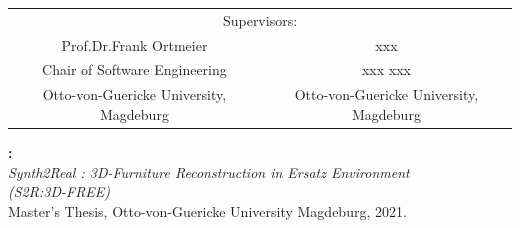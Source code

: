 \documentclass[
]{thesis}
\newcommand{\university}{Otto-von-Guericke University Magdeburg}
\newcommand{\advisorone}{Marco Filax}
\newcommand{\departmentone}{Chair of Software Engineering}
\newcommand{\universityone}{Otto-von-Guericke University, Magdeburg}
\newcommand{\advisortwo}{Konstantin Kirchheim}
\newcommand{\departmenttwo}{Chair of Software Engineering}
\newcommand{\universitytwo}{Otto-von-Guericke University, Magdeburg}
\newcommand{\supervisorone}{Prof.Dr.Frank Ortmeier}
\newcommand{\sdepartmentone}{Chair of Software Engineering}
\newcommand{\suniversityone}{Otto-von-Guericke University, Magdeburg}
\newcommand{\supervisortwo}{xxx}
\newcommand{\sdepartmenttwo}{xxx xxx}
\newcommand{\suniversitytwo}{Otto-von-Guericke University, Magdeburg}
\newcommand{\advisorthree}{}
\newcommand{\departmentthree}{}
\newcommand{\universitythree}{}
\newcommand{\thesiskind}{Master's Thesis}
\newcommand{\thetitle}{Synth2Real : 3D-Furniture Reconstruction in Ersatz Environment \\ (S2R:3D-FREE)}
\newcommand{\theyear}{2021}
\begin{document}
\begin{titlepage}
\begin{center}
    \begin{tabular}{cc}
        \multicolumn{2}{c}{\small Supervisors:} \\[1mm]
        {\large \supervisorone} & {\large \supervisortwo} \\[2mm]
        {\small \sdepartmentone} 			 & {\small \sdepartmenttwo} \\
        {\small \suniversityone} 			 & {\small \suniversitytwo} 	\\
    \end{tabular}

    \renewcommand{\arraystretch}{1}
    \end{center}
    \vspace*{\fill}
\end{titlepage}

\thispagestyle{empty}
\vspace*{\fill}
\begin{minipage}{15.0cm}
    \textbf{\theauthorrev:}\\
    \emph{\thetitle\\}
    \thesiskind, \university, \theyear.
\end{minipage}
\newpage

\iftoggle{german}{\chapter*{Zusammenfassung}}{\chapter*{Abstract}}
\end{document}
